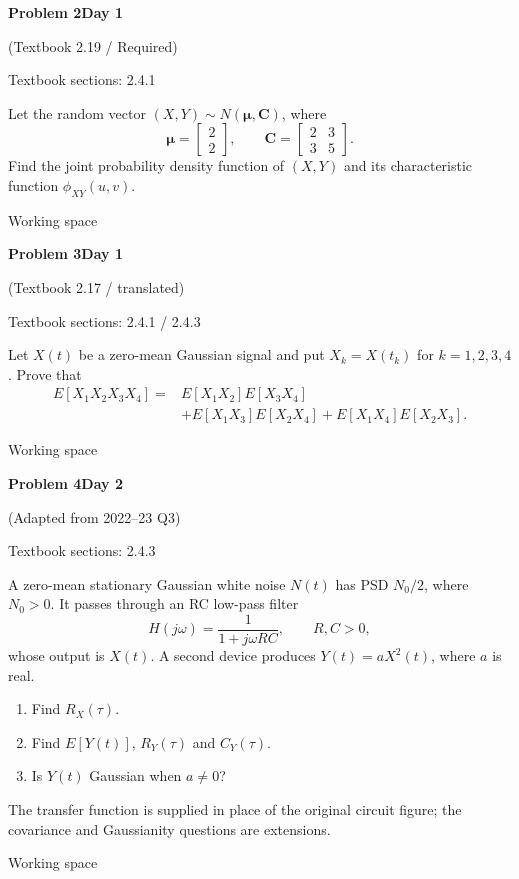 \documentclass[11pt]{article}
\newcommand{\qtitle}[2]{\clearpage\begin{tcolorbox}[colback=navy,colframe=navy,arc=1.5pt,boxrule=0pt]\color{white}\large\bfseries #1\hfill\small #2\end{tcolorbox}}
\begin{document}
\qtitle{Problem 2}{Day 1}
{\small\color{accentred}(Textbook 2.19 / Required)}\par\smallskip
{\small\color{muted}Textbook sections: 2.4.1}\par\medskip
\begin{tcolorbox}[colback=qbg,colframe=qbg,boxrule=0pt]Let the random vector $(X,Y)\sim N(\boldsymbol{\mu},\boldsymbol{C})$, where
\[
\boldsymbol{\mu}=\begin{bmatrix}2\\2\end{bmatrix},\qquad
\boldsymbol{C}=\begin{bmatrix}2&3\\3&5\end{bmatrix}.
\]
Find the joint probability density function of $(X,Y)$ and its characteristic function $\phi_{XY}(u,v)$.
\end{tcolorbox}\smallskip\begin{workspace}\hfill{\color{linec}\footnotesize Working space}\end{workspace}
\qtitle{Problem 3}{Day 1}
{\small\color{accentred}(Textbook 2.17 / translated)}\par\smallskip
{\small\color{muted}Textbook sections: 2.4.1 / 2.4.3}\par\medskip
\begin{tcolorbox}[colback=qbg,colframe=qbg,boxrule=0pt]Let $X(t)$ be a zero-mean Gaussian signal and put $X_k=X(t_k)$ for $k=1,2,3,4$. Prove that
\[\begin{aligned}E[X_1X_2X_3X_4]={}&E[X_1X_2]E[X_3X_4]\\&+E[X_1X_3]E[X_2X_4]+E[X_1X_4]E[X_2X_3].\end{aligned}\]
\end{tcolorbox}\smallskip\begin{workspace}\hfill{\color{linec}\footnotesize Working space}\end{workspace}
\qtitle{Problem 4}{Day 2}
{\small\color{accentred}(Adapted from 2022--23 Q3)}\par\smallskip
{\small\color{muted}Textbook sections: 2.4.3}\par\medskip
\begin{tcolorbox}[colback=qbg,colframe=qbg,boxrule=0pt]A zero-mean stationary Gaussian white noise $N(t)$ has PSD $N_0/2$, where $N_0>0$. It passes through an RC low-pass filter
\[H(j\omega)=\frac1{1+j\omega RC},\qquad R,C>0,\]
whose output is $X(t)$. A second device produces $Y(t)=aX^2(t)$, where $a$ is real.
\begin{enumerate}\item Find $R_X(\tau)$.\item Find $E[Y(t)]$, $R_Y(\tau)$ and $C_Y(\tau)$.\item Is $Y(t)$ Gaussian when $a\ne0$?\end{enumerate}
The transfer function is supplied in place of the original circuit figure; the covariance and Gaussianity questions are extensions.
\end{tcolorbox}\smallskip\begin{workspace}\hfill{\color{linec}\footnotesize Working space}\end{workspace}
\end{document}
